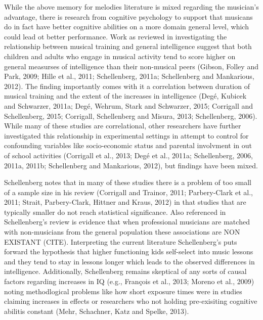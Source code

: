 \documentclass[]{book}
\begin{document}
While the above memory for melodies literature is mixed regarding the musician's advantage, there is research from cognitive psychology to support that musicans do in fact have better cognitive abilities on a more domain general level, which could lead ot better performance.
Work as reviewed in \citet{schellenbergMusicNonmusicalAbilities2017} investigating the relationship between musical training and general intelligence suggest that both children and adults who engage in musical activity tend to score higher on general measurses of intelligence than their non-musical peers (Gibson, Folley and Park, 2009; Hille et al., 2011; Schellenberg, 2011a; Schellenberg and Mankarious, 2012).
The finding importantly comes with it a correlation between duration of musical training and the extent of the increases in intelligence (Degé, Kubicek and Schwarzer, 2011a; Degé, Wehrum, Stark and Schwarzer, 2015; Corrigall and Schellenberg, 2015; Corrigall, Schellenberg and Misura, 2013; Schellenberg, 2006).
While many of these studies are correlational, other researchers have further investigated this relationship in experimental settings in attempt to control for confounding variables like socio-economic status and parental involvment in out of school activities (Corrigall et al., 2013; Degé et al., 2011a; Schellenberg, 2006, 2011a, 2011b; Schellenberg and Mankarious, 2012), but findings have been mixed.

Schellenberg \citep{schellenbergMusicNonmusicalAbilities2017} notes that in many of these studies there is a problem of too small of a sample size in his review (Corrigall and Trainor, 2011; Parbery-Clark et al., 2011; Strait, Parbery-Clark, Hittner and Kraus, 2012) in that studies that are typically smaller do not reach statistical significance.
Also referenced in Schellenberg's review is evidence that when professional musicians are matched with non-musicians from the general population these associations are NON EXISTANT (CITE).
Interpreting the current literature Schellenberg's puts forward the hypothesis that higher functioning kids self-select into music lessons and they tend to stay in lessons longer which leads to the observed differences in intelligence.
Additionally, Schellenberg remains skeptical of any sorts of causal factors regarding increases in IQ (e.g., François et al., 2013; Moreno et al., 2009) noting methodlogical problems like how short exposure times were in studies claiming increases in effects or researchers who not holding pre-exisiting cognitive abilitis constant (Mehr, Schachner, Katz and Spelke, 2013).
\end{document}
